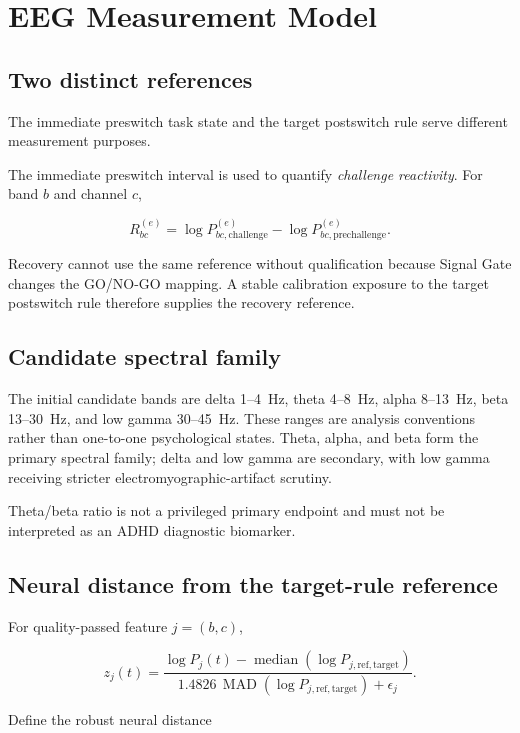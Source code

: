 \section{EEG Measurement Model}

\subsection{Two distinct references}

The immediate preswitch task state and the target postswitch rule serve different measurement purposes.

The immediate preswitch interval is used to quantify \emph{challenge reactivity}. For band \(b\) and channel \(c\),

\[
R_{bc}^{(e)}
=
\log P_{bc,\mathrm{challenge}}^{(e)}
-
\log P_{bc,\mathrm{prechallenge}}^{(e)}.
\]

Recovery cannot use the same reference without qualification because Signal Gate changes the GO/NO-GO mapping. A stable calibration exposure to the target postswitch rule therefore supplies the recovery reference.

\subsection{Candidate spectral family}

The initial candidate bands are delta 1--4~Hz, theta 4--8~Hz, alpha 8--13~Hz, beta 13--30~Hz, and low gamma 30--45~Hz. These ranges are analysis conventions rather than one-to-one psychological states. Theta, alpha, and beta form the primary spectral family; delta and low gamma are secondary, with low gamma receiving stricter electromyographic-artifact scrutiny.

Theta/beta ratio is not a privileged primary endpoint and must not be interpreted as an ADHD diagnostic biomarker.

\subsection{Neural distance from the target-rule reference}

For quality-passed feature \(j=(b,c)\),

\[
z_j(t)
=
\frac{
\log P_j(t)
-
\operatorname{median}\!\left(\log P_{j,\mathrm{ref,target}}\right)
}{
1.4826\,\operatorname{MAD}\!\left(\log P_{j,\mathrm{ref,target}}\right)
+
\epsilon_j
}.
\]

Define the robust neural distance

